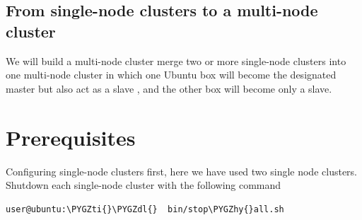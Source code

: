 \documentclass[a4paper,12pt,oneside]{sphinxmanual}
\def\PYGZdl{\char`\$}
\def\PYGZhy{\char`\-}
\def\PYGZti{\char`\~}
\begin{document}
\subsection{From single-node clusters to a multi-node cluster}
\label{document:from-single-node-clusters-to-a-multi-node-cluster}
We will build a multi-node cluster merge two or more single-node clusters into one multi-node cluster in which one Ubuntu box will become the designated master but also act as a slave , and the other box will become only a slave.
\begin{figure}[htbp]
\centering

\end{figure}


\section{Prerequisites}
\label{document:id5}
Configuring single-node clusters first, here we have used two single node clusters.
Shutdown each single-node cluster with the following command

\begin{Verbatim}[commandchars=\\\{\}]
user@ubuntu:\PYGZti{}\PYGZdl{}  bin/stop\PYGZhy{}all.sh
\end{Verbatim}
\end{document}
